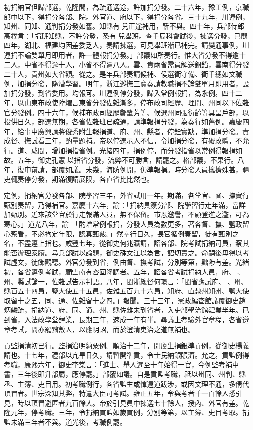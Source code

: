 \begin{pinyinscope}
初捐納官但歸部選，乾隆間，為疏通選途，許加捐分發。二十六年，豫工例，京職郎中以下，得捐分各部、院。外官道、府以下，得捐分各省。三十九年，川運例，知州、同知、通判捐分發如舊。知縣有兒正途補用，靳不與。四十年，兵部侍郎高樸言：「捐班知縣，不許分發，恐有兒舉班。查壬辰科會試後，揀選分發，已閱四年，湖北、福建均因差委乏人，奏請揀選，可見舉班漸已補完。請變通事例，川運捐不論雙單月即用者，許一體報捐分發。」部議如所奏行。惟大省分發不得逾十二人，中省不得逾十人，小省不得逾八人。雲、貴兩省需員解送銅鉛，雲南得分發二十人，貴州如大省額。從之。是年兵部奏請候補、候選衛守備、衛千總如文職例，加捐分發，隨漕學習。明年，浙江巡撫三寶奏請教職捐不論雙單月即用者，設加捐分發，到省委用。均報可。川運例停分發，歸入常例報捐，為永例。四十二年，以山東布政使陸燿言東省分發佐雜漸多，停布政司經歷、理問、州同以下佐雜官分發例。四十六年，候補布政司經歷鄭肇芳等、候選州同張衍齡等具呈戶部，以投供日久，部選無期，各省佐雜班已疏通，請準報捐分發，為奏行如舊例。嘉慶四年，給事中廣興請將俊秀附生報捐道、府、州、縣者，停銓實缺，準加捐分發。責成督、撫試看三年，酌量題補。帝以停選示人不信，令加捐分發，有礙政體，不允行。道、咸間，增加捐指省例。光緒四年，捐例停，而分發指省以常例得報捐如故。五年，御史孔憲以指省分發，流弊不可勝言，請罷之。格部議，不果行。八年，復申前請，部覆如議。未幾，海防例開，仍準報捐。時分發人員擁擠殊甚，疆吏輒奏停分發，期滿復請展限，各直省比比然也。

定例，捐納官分發各部、院學習三年，外省試用一年。期滿，各堂官、督、撫實行甄別奏留，乃得補官。嘉慶十六年，諭：「捐納員簽分部、院學習行走年滿，當詳加甄別。近來該堂官於行走報滿人員，無不保留。市恩邀譽，不顧登進之濫，可為寒心。」道光八年，諭：「酌增常例報捐，分發人員為數更多，著各督、撫、鹽政留心察看，不必拘定年限，認真甄覈。」然奉行日久，長官循例奏留，徒有甄別之名，不盡遵上指也。咸豐七年，從御史何兆瀛請，詔各部、院考試捐納司員，察其能否辦理案牘。尋兵部試以論題，御史硃文江以為言，詔切責之。命嗣後毋得以考試虛文，徒飾觀聽。外官分發到省，例由督、撫考試，分別等第，黜陟有差。光緒初，各省遵例考試，顧雲南有咨回降調者。五年，詔各省考試捐納人員，府、、州、縣試論一，佐雜試告示判語。八年，閩浙總督何璟言：「閩省應試府、、州、縣百五十四員，鹽大使五十五員，佐雜五百九十六員，知府、直隸州知州、鹽大使取留十之五，同、通、佐雜留十之四。」報聞。三十三年，憲政編查館議覆御史趙炳麟疏，捐納道、府、同、通、州、縣佐雜未到省者，入吏部學治館肄業半年。已到省，入法政學堂肄業，長期三年，速成一年有半。尋議上考驗外官章程，各省遵章考試，間亦罷黜數人，以應明詔，而於澄清吏治之道無補也。

貢監捐清初已行。監捐沿明納粟例。順治十二年，開廩生捐銀準貢例，從御史楊義請也。十七年，禮部以亢旱日久，請暫開準貢，令士民納銀賑濟。允之。貢監例得考職，康熙六年，御史李棠言：「進士、舉人遲至十年始得一官，今例監考補中書，三年後即升部屬，應停罷。」部覆如議。自是貢監考職，祗以州同、州判、縣丞、主簿、吏目用。初考職例行，各省監生或憚遠道跋涉，或因文理不通，多倩代頂冒者。世宗深知其弊，特遣大臣司考試。雍正五年，令與考者千一百餘人悉引見，時以頂冒避匿者九百餘人。帝於引見員中揀選七十餘人，授內、外官有差。乾隆元年，停考職。三年，令捐納貢監如歲貢例，分別等第，以主簿、吏目考取。捐監未滿三年者不與。道光後，考職例罷。


\end{pinyinscope}
